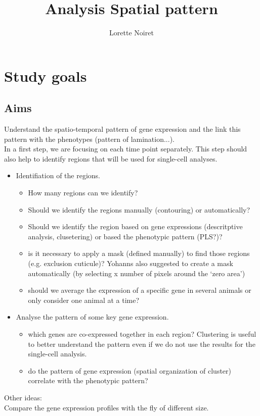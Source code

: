 \documentclass[]{article}
\title{Analysis Spatial pattern}
\author{Lorette Noiret}
\begin{document}
\maketitle
\section{Study goals}
\subsection{Aims}
Understand the spatio-temporal pattern of gene expression and the link this pattern with the phenotypes (pattern of lamination...). \\
In a first step, we are focusing on each time point separately. This step should also help to identify regions that will be used for single-cell analyses.
\begin{itemize}
	\item Identifiation of the regions.
	\begin{itemize}
		\item How many regions can we identify? 
		\item Should we identify the regions manually (contouring) or automatically?
		\item Should we identify the region based on gene expressions (descritptive analysis, clusetering) or based the phenotypic pattern (PLS?)?
		\item is it necessary to apply a mask (defined manually) to find those regions (e.g. exclusion cuticule)? Yohanns also suggested to create a mask automatically (by selecting x number of pixels around the `zero area')
		\item should we average the expression of a specific gene in several animals or only consider one animal at a time?
	\end{itemize}
	\item Analyse the pattern of some key gene expression. 
		\begin{itemize}
		\item which genes are co-expressed together in each region? Clustering is useful to better understand the pattern even if we do not use the results for the single-cell analysis. 
		\item do the pattern of gene expression (spatial organization of cluster) correlate with the phenotypic pattern?
	\end{itemize}
\end{itemize}
Other ideas:\\
Compare the gene expression profiles with the fly  of different size. \\
\end{document}
